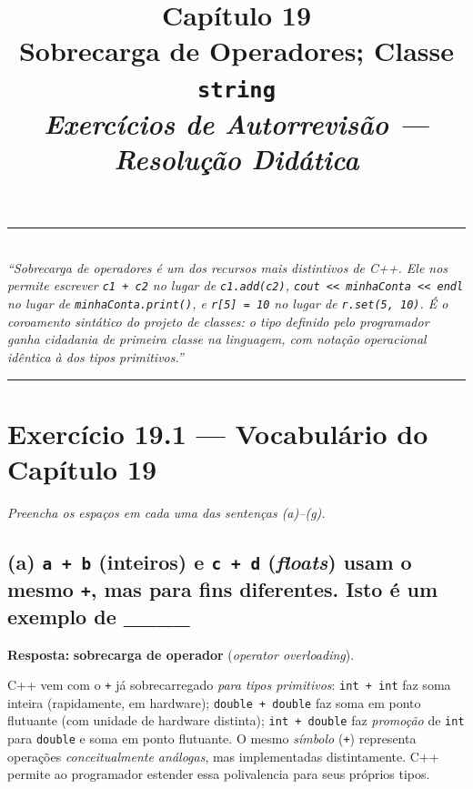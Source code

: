 \documentclass[11pt,a4paper]{article}
\title{
  \vspace{-1cm}
  {\Huge\bfseries\color{deitelblue} Cap\'itulo 19}\\[0.3em]
  {\Large\bfseries Sobrecarga de Operadores; Classe \texttt{string}}\\[0.8em]
  {\large\itshape Exerc\'icios de Autorrevis\~ao --- Resolu\c{c}\~ao Did\'atica}
}
\author{}
\date{}
\begin{document}
\maketitle
\thispagestyle{empty}
\vspace{-2em}

\begin{center}
\rule{0.85\textwidth}{0.5pt}\\[0.4em]
\textit{``Sobrecarga de operadores \'e um dos recursos mais distintivos de C++. Ele nos permite escrever \texttt{c1 + c2} no lugar de \texttt{c1.add(c2)}, \texttt{cout << minhaConta << endl} no lugar de \texttt{minhaConta.print()}, e \texttt{r[5] = 10} no lugar de \texttt{r.set(5, 10)}. \'E o coroamento sint\'atico do projeto de classes: o tipo definido pelo programador ganha cidadania de primeira classe na linguagem, com nota\c{c}\~ao operacional id\^entica \`a dos tipos primitivos.''}\\[0.4em]
\rule{0.85\textwidth}{0.5pt}
\end{center}

\vspace{1em}

\section{Exerc\'icio 19.1 --- Vocabul\'ario do Cap\'itulo 19}

\textit{Preencha os espa\c{c}os em cada uma das senten\c{c}as (a)--(g).}

\subsection*{(a) \texttt{a + b} (inteiros) e \texttt{c + d} (\emph{floats}) usam o mesmo \texttt{+}, mas para fins diferentes. Isto \'e um exemplo de \_\_\_\_}

\begin{resposta}\textbf{Resposta:} \textbf{sobrecarga de operador} (\emph{operator overloading}).\end{resposta}

C++ vem com o \texttt{+} j\'a sobrecarregado \emph{para tipos primitivos}: \texttt{int + int} faz soma inteira (rapidamente, em hardware); \texttt{double + double} faz soma em ponto flutuante (com unidade de hardware distinta); \texttt{int + double} faz \emph{promo\c{c}\~ao} de \texttt{int} para \texttt{double} e soma em ponto flutuante. O mesmo \emph{s\'imbolo} (\texttt{+}) representa opera\c{c}\~oes \emph{conceitualmente an\'alogas}, mas implementadas distintamente. C++ permite ao programador estender essa polivalencia para seus pr\'oprios tipos.
\end{document}
